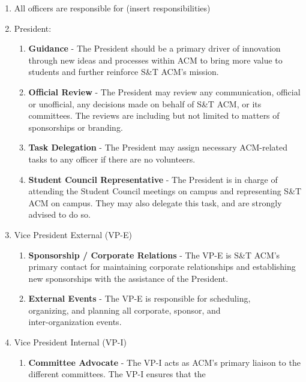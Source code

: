    \begin{enumerate}[label=\arabic*.]
      \item All officers are responsible for (insert responsibilities)
      \item President:
        \begin{enumerate}[label=\alph*.]
          \item \textbf{Guidance} - The President should be a primary driver of
            innovation through new ideas and processes within ACM to bring more
            value to students and further reinforce S\&T ACM's mission.
          \item \textbf{Official Review} - The President may review any
          communication, official or unofficial, any decisions made on behalf of
          S\&T ACM, or its committees. The reviews are including but not limited
          to matters of sponsorships or branding.
          \item \textbf{Task Delegation} - The President may assign necessary
            ACM-related tasks to any officer if there are no volunteers.
          \item \textbf{Student Council Representative} - The President is in charge of
          attending the Student Council meetings on campus and representing S\&T
          ACM on campus. They may also delegate this task, and are strongly
          advised to do so.
        \end{enumerate}
      \item Vice President External (VP-E)
        \begin{enumerate}[label=\alph*.]
          \item \textbf{Sponsorship / Corporate Relations} - The VP-E is S\&T ACM's
            primary contact for maintaining corporate relationships and
            establishing new sponsorships with the assistance of the President. 
          \item \textbf{External Events} - The VP-E is responsible for
            scheduling,\\ organizing, and planning all corporate, sponsor, and\\
            inter-organization events.
        \end{enumerate}
      \item Vice President Internal (VP-I)
        \begin{enumerate}[label=\alph*.]
          \item \textbf{Committee Advocate} - The VP-I acts as ACM's primary
            liaison to the different committees. The VP-I ensures that the

\end{enumerate}
\end{enumerate}
